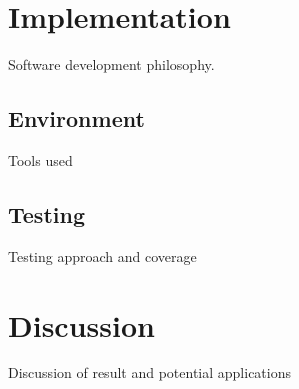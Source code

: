 \documentclass[12pt,a4paper,titlepage,oneside,english]{article}
\begin{document}
\section{Implementation}
Software development philosophy.
\subsection{Environment}
Tools used
\subsection{Testing}
Testing approach and coverage



\section{Discussion}
Discussion of result and potential applications



\newpage
\setcounter{page}{1}
\onehalfspacing
{}



\end{document}
